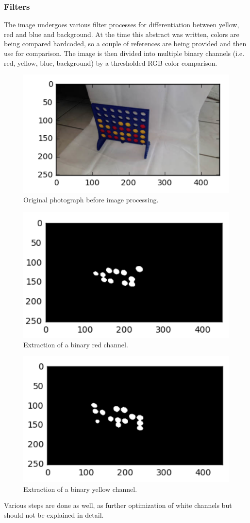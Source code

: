 \documentclass[10pt,twocolumn,letterpaper]{article}
\begin{document}
\subsubsection{Filters}
The image undergoes various filter processes for differentiation between yellow, red and blue and background.
At the time this abstract was written, colors are being compared hardcoded, so a couple of references are being provided and then use for comparison.
The image is then divided into multiple binary channels (i.e. red, yellow, blue, background) by a thresholded RGB color comparison.
\begin{figure}[bh]
  \centering
  \includegraphics[width = .3\textwidth]{figures/camera.png}
  \caption{Original photograph before image processing.}
  \label{fig:capturedImage}
\end{figure}
\begin{figure}[bh]
  \centering
  \includegraphics[width = .3\textwidth]{figures/redChannel.png}
  \caption{Extraction of a binary red channel.}
  \label{fig:redChannel}
\end{figure}
\begin{figure}[bh]
  \centering
  \includegraphics[width = .3\textwidth]{figures/yellowChannel.png}
  \caption{Extraction of a binary yellow channel.}
  \label{fig:yellowChannel}
\end{figure}
Various steps are done as well, as further optimization of white channels but should not be explained in detail.
\end{document}
